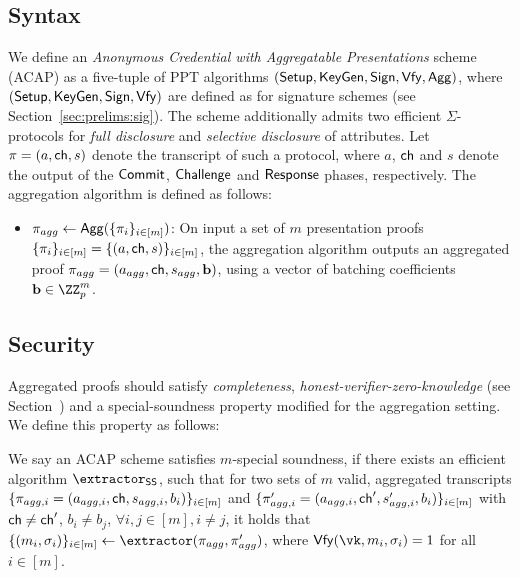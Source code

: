 \subsection{Syntax}
We define an \emph{Anonymous Credential with Aggregatable Presentations} scheme (ACAP) as a five-tuple of PPT algorithms $(\mathsf{Setup}, \mathsf{KeyGen}, \mathsf{Sign}, \mathsf{Vfy}, \mathsf{Agg})$, where $(\mathsf{Setup}, \mathsf{KeyGen}, \mathsf{Sign}, \mathsf{Vfy})$ are defined as for signature schemes (see Section~\ref{sec:prelims:sig}). The scheme additionally admits two efficient $\Sigma$-protocols for \textit{full disclosure} and \textit{selective disclosure} of attributes. Let $\pi=(a,\mathsf{ch},s)$ denote the transcript of such a protocol, where $a$, $\mathsf{ch}$ and $s$ denote the output of the $\mathsf{Commit}$, $\mathsf{Challenge}$ and $\mathsf{Response}$ phases, respectively. The aggregation algorithm is defined as follows:
\begin{itemize}
    \item $\pi_{agg} \gets \mathsf{Agg}(\{\pi_i\}_{i\in[m]})$: On input a set of $m$ presentation proofs $\{\pi_i\}_{i\in[m]}=\{(a,\mathsf{ch},s)\}_{i\in[m]}$, the aggregation algorithm outputs an aggregated proof $\pi_{agg}=(a_{agg},\mathsf{ch},s_{agg},\mathbf{b})$, using a vector of batching coefficients $\batchcoeff\in\ZZ_p^m$.
\end{itemize}

\subsection{Security}
Aggregated proofs should satisfy \emph{completeness}, \emph{honest-verifier-zero-knowledge} (see Section~\missingcite) and a special-soundness property modified for the aggregation setting. We define this property as follows:

\begin{definition}
We say an ACAP scheme satisfies $m$-special soundness, if there exists an efficient algorithm $\extractor_{\textsf{SS}}$, such that for two sets of $m$ valid, aggregated transcripts $\{\pi_{agg,i}=(a_{agg,i},\mathsf{ch},s_{agg,i},b_i)\}_{i\in[m]}$ and $\{\pi'_{agg,i}=(a_{agg,i},\mathsf{ch}',s'_{agg,i},b_i)\}_{i\in[m]}$ with $\mathsf{ch} \neq \mathsf{ch}'$, $b_i\neq b_j$, $\forall i,j\in[m], i\neq j$, it holds that $\{(m_i,\sigma_i)\}_{i\in[m]}\gets \extractor(\pi_{agg},\pi'_{agg})$, where $\Vfy(\vk,m_i,\sigma_i)=1$ for all $i\in [m]$.
\end{definition}


